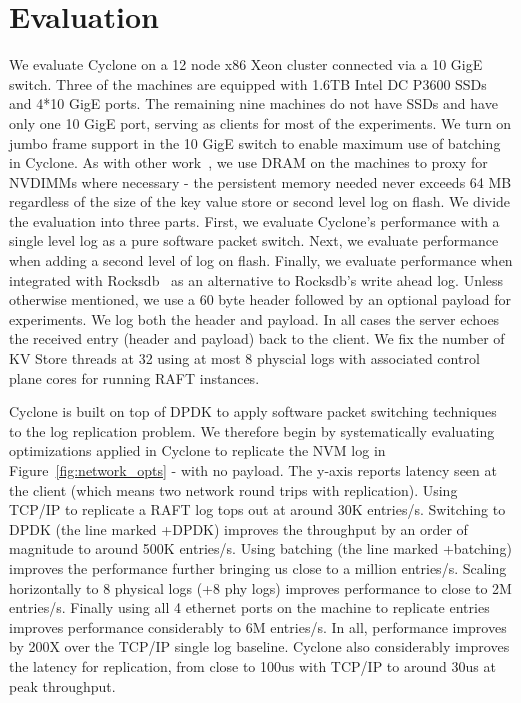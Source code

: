 \documentclass[10pt, preprint, nonatbib]{sigplanconf}
\begin{document}
\section{Evaluation}
\label{sec:evaluation}
We evaluate Cyclone on a 12 node x86 Xeon cluster connected via a 10 GigE
switch. Three of the machines are equipped with 1.6TB Intel DC P3600 SSDs and
4*10 GigE ports. The remaining nine machines do not have SSDs and have only one
10 GigE port, serving as clients for most of the experiments. We turn on jumbo
frame support in the 10 GigE switch to enable maximum use of batching in
Cyclone. As with other work~\cite{faast}, we use DRAM on the machines to proxy
for NVDIMMs where necessary - the persistent memory needed never exceeds 64 MB
regardless of the size of the key value store or second level log on flash. We
divide the evaluation into three parts. First, we evaluate Cyclone's performance
with a single level log as a pure software packet switch. Next, we evaluate
performance when adding a second level of log on flash. Finally, we evaluate
performance when integrated with Rocksdb~\cite{rocksdb} as an alternative to
Rocksdb's write ahead log. Unless otherwise mentioned, we use a 60 byte header
followed by an optional payload for experiments. We log both the header and
payload. In all cases the server echoes the received entry (header and payload)
back to the client. We fix the number of KV Store threads at 32 using at most 8
physcial logs with associated control plane cores for running RAFT instances.

Cyclone is built on top of DPDK to apply software packet switching techniques to
the log replication problem. We therefore begin by systematically evaluating
optimizations applied in Cyclone to replicate the NVM log in
Figure~\ref{fig:network_opts} - with no payload. The y-axis reports latency seen
at the client (which means two network round trips with replication). Using
TCP/IP to replicate a RAFT log tops out at around 30K entries/s.  Switching to
DPDK (the line marked +DPDK) improves the throughput by an order of magnitude to
around 500K entries/s. Using batching (the line marked +batching) improves the
performance further bringing us close to a million entries/s. Scaling
horizontally to 8 physical logs (+8 phy logs) improves performance to close to
2M entries/s. Finally using all 4 ethernet ports on the machine to replicate
entries improves performance considerably to 6M entries/s. In all, performance
improves by 200X over the TCP/IP single log baseline. Cyclone also considerably
improves the latency for replication, from close to 100us with TCP/IP to around
30us at peak throughput.
\end{document}
